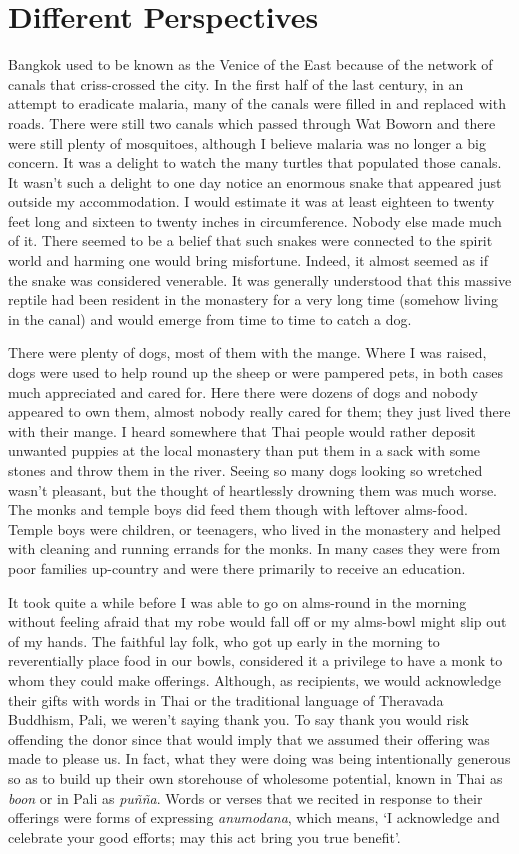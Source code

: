 \chapter{Different Perspectives}

Bangkok used to be known as the Venice of the East because of the
network of canals that criss-crossed the city. In the first half of the
last century, in an attempt to eradicate malaria, many of the canals
were filled in and replaced with roads. There were still two canals
which passed through Wat Boworn and there were still plenty of
mosquitoes, although I believe malaria was no longer a big concern. It
was a delight to watch the many turtles that populated those canals. It
wasn't such a delight to one day notice an enormous snake that appeared
just outside my accommodation. I would estimate it was at least eighteen
to twenty feet long and sixteen to twenty inches in circumference.
Nobody else made much of it. There seemed to be a belief that such
snakes were connected to the spirit world and harming one would bring
misfortune. Indeed, it almost seemed as if the snake was considered
venerable. It was generally understood that this massive reptile had
been resident in the monastery for a very long time (somehow living in
the canal) and would emerge from time to time to catch a dog.

There were plenty of dogs, most of them with the mange. Where I was
raised, dogs were used to help round up the sheep or were pampered pets,
in both cases much appreciated and cared for. Here there were dozens of
dogs and nobody appeared to own them, almost nobody really cared for
them; they just lived there with their mange. I heard somewhere that
Thai people would rather deposit unwanted puppies at the local monastery
than put them in a sack with some stones and throw them in the river.
Seeing so many dogs looking so wretched wasn't pleasant, but the thought
of heartlessly drowning them was much worse. The monks and temple boys
did feed them though with leftover alms-food. Temple boys were children,
or teenagers, who lived in the monastery and helped with cleaning and
running errands for the monks. In many cases they were from poor
families up-country and were there primarily to receive an education.

It took quite a while before I was able to go on alms-round in the
morning without feeling afraid that my robe would fall off or my
alms-bowl might slip out of my hands. The faithful lay folk, who got up
early in the morning to reverentially place food in our bowls,
considered it a privilege to have a monk to whom they could make
offerings. Although, as recipients, we would acknowledge their gifts
with words in Thai or the traditional language of Theravada Buddhism,
Pali, we weren't saying thank you. To say thank you would risk offending
the donor since that would imply that we assumed their offering was made
to please us. In fact, what they were doing was being intentionally
generous so as to build up their own storehouse of wholesome potential,
known in Thai as \emph{boon} or in Pali as \emph{puñña}. Words or verses
that we recited in response to their offerings were forms of expressing
\emph{anumodana}, which means, `I acknowledge and celebrate your good
efforts; may this act bring you true benefit'.

